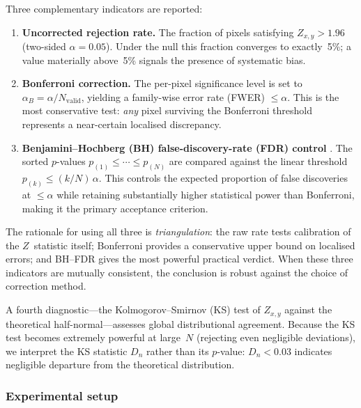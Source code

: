 Three complementary indicators are reported:

\begin{enumerate}
\item \textbf{Uncorrected rejection rate.}
      The fraction of pixels satisfying $Z_{x,y}>1.96$ (two-sided
      $\alpha=0.05$).  Under the null this fraction converges to
      exactly~5\%; a value materially above~5\% signals the presence
      of systematic bias.

\item \textbf{Bonferroni correction.}
      The per-pixel significance level is set to
      $\alpha_{B}=\alpha/N_{\mathrm{valid}}$, yielding a
      family-wise error rate (FWER) $\le\alpha$.  This is the most
      conservative test: \emph{any} pixel surviving the Bonferroni
      threshold represents a near-certain localised discrepancy.

\item \textbf{Benjamini--Hochberg (BH) false-discovery-rate (FDR)
      control} \cite{benjamini1995}.
      The sorted $p$-values $p_{(1)}\le\cdots\le p_{(N)}$ are compared
      against the linear threshold $p_{(k)}\le (k/N)\,\alpha$.
      This controls the expected proportion of false discoveries at
      $\le\alpha$ while retaining substantially higher statistical
      power than Bonferroni, making it the primary acceptance criterion.
\end{enumerate}

The rationale for using all three is \emph{triangulation}: the raw rate
tests calibration of the $Z$~statistic itself; Bonferroni provides a
conservative upper bound on localised errors; and BH--FDR gives the
most powerful practical verdict.  When these three indicators are
mutually consistent, the conclusion is robust against the choice of
correction method.

A fourth diagnostic---the Kolmogorov--Smirnov (KS) test of $Z_{x,y}$
against the theoretical half-normal---assesses global distributional
agreement.  Because the KS test becomes extremely powerful at large~$N$
(rejecting even negligible deviations), we interpret the KS statistic
$D_n$ rather than its $p$-value: $D_n < 0.03$ indicates negligible
departure from the theoretical distribution.

\subsubsection{Experimental setup}

